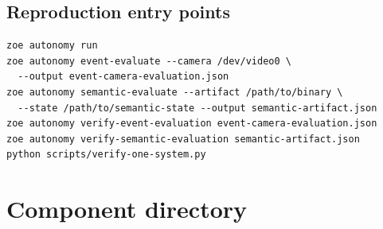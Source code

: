 \documentclass[11pt]{article}
\begin{document}
\subsection{Reproduction entry points}

\begin{lstlisting}
zoe autonomy run
zoe autonomy event-evaluate --camera /dev/video0 \
  --output event-camera-evaluation.json
zoe autonomy semantic-evaluate --artifact /path/to/binary \
  --state /path/to/semantic-state --output semantic-artifact.json
zoe autonomy verify-event-evaluation event-camera-evaluation.json
zoe autonomy verify-semantic-evaluation semantic-artifact.json
python scripts/verify-one-system.py
\end{lstlisting}

\clearpage
\section{Component directory}
\end{document}
